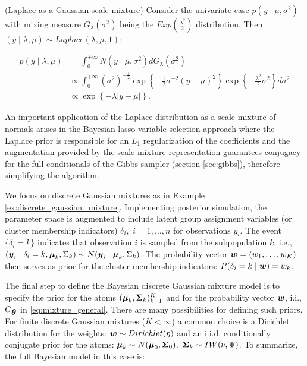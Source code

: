 \begin{exem}
(Laplace as a Gaussian scale mixture) Consider the univariate case $p(y\mid \mu, \sigma^2)$ with mixing measure $G_{\lambda}(\sigma^2)$ being the $Exp\left(\frac{\lambda^2}{2}\right)$ distribution. Then $(y \mid \lambda, \mu) \sim Laplace(\lambda, \mu, 1)$:

\begin{align*}
p(y \mid \lambda, \mu) &= \int^{+\infty}_0 N(y\mid \mu, \sigma^2)dG_{\lambda}(\sigma^2)\\
&\propto \int^{+\infty}_0 (\sigma^2)^{-\frac{1}{2}}\exp\left\{ -\frac{1}{2}\sigma^{-2}(y - \mu)^2\right\}\exp\left\{-\frac{\lambda^2}{2}\sigma^2\right\}d\sigma^2\\
&\propto \exp\left\{ -\lambda |y - \mu| \right\}.
\end{align*}
\label{ex:laplace_mixture}

\noindent An important application of the Laplace distribution as a scale mixture of normals arises in the Bayesian lasso \citep{bayesian_lasso} variable selection approach where the Laplace prior is responsible for an $L_1$ regularization of the coefficients and the augmentation provided by the scale mixture representation guarantees conjugacy for the full conditionals of the Gibbs sampler (section \ref{sec:gibbs}), therefore simplifying the algorithm.

\end{exem}

We focus on discrete Gaussian mixtures as in Example \ref{ex:discrete_gaussian_mixture}. Implementing posterior simulation, the parameter space is augmented to include latent group assignment variables (or cluster membership indicators) $\delta_i,$ $i = 1, \ldots, n$ for observations $y_i$. The event $\{\delta_i = k\}$ indicates that observation $i$ is sampled from the subpopulation $k$, i.e., $(\mbox{\boldmath $y$}_i \mid \delta_i = k, \mbox{\boldmath $\mu$}_k, \Sigma_k) \sim N(\mbox{\boldmath $y$}_i\mid \mbox{\boldmath $\mu$}_k, \Sigma_k)$. The probability vector $\mbox{\boldmath $w$} = (w_1, \ldots, w_K)$ then serves as prior for the cluster membership indicators: $P(\delta_i = k \mid \mbox{\boldmath $w$}) = w_k$.


The final step to define the Bayesian discrete Gaussian mixture model is to specify the prior for the atoms $(\mbox{\boldmath $\mu$}_k, \mbox{\boldmath $\Sigma$}_k)^K_{k=1}$ and for the probability vector $\mbox{\boldmath $w$}$, i.i., $G_{\mbox{\boldmath $\theta$}}$ in \eqref{eq:mixture_general}. There are many possibilities for defining such priors. For finite discrete Gaussian mixtures ($K<\infty$) a common choice is a Dirichlet distribution for the weights: $\mbox{\boldmath $w$} \sim Dirichlet(\eta)$ and an i.i.d. conditionally conjugate prior for the atoms: $\mbox{\boldmath $\mu$}_k \sim N(\mbox{\boldmath $\mu$}_0, \mbox{\boldmath $\Sigma$}_0)$, $\mbox{\boldmath $\Sigma$}_k \sim IW(\nu, \Psi)$. To summarize, the full Bayesian model in this case is:


